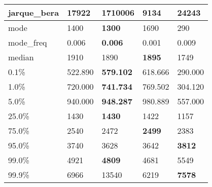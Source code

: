 \begin{table}[H]
\begin{tabular}{|l|m{10em}|m{10em}|m{10em}|m{10em}|}
\hline jarque\_bera & 17922 & \cellcolor[rgb]{0.9, 0.54, 0.52} 1710006 & 9134 & \bfseries 24243 \\
\hline mode & 1400 & \bfseries 1300 & 1690 & \cellcolor[rgb]{0.9, 0.54, 0.52} 290 \\
\hline mode\_freq & 0.006 & \bfseries 0.006 & \cellcolor[rgb]{0.9, 0.54, 0.52} 0.001 & 0.009 \\
\hline median & 1910 & 1890 & \bfseries 1895 & \cellcolor[rgb]{0.9, 0.54, 0.52} 1749 \\
\hline 0.1\% & 522.890 & \bfseries 579.102 & 618.666 & \cellcolor[rgb]{0.9, 0.54, 0.52} 290.000 \\
\hline 1.0\% & 720.000 & \bfseries 741.734 & 769.502 & \cellcolor[rgb]{0.9, 0.54, 0.52} 304.120 \\
\hline 5.0\% & 940.000 & \bfseries 948.287 & 980.889 & \cellcolor[rgb]{0.9, 0.54, 0.52} 557.000 \\
\hline 25.0\% & 1430 & \bfseries 1430 & 1422 & \cellcolor[rgb]{0.9, 0.54, 0.52} 1157 \\
\hline 75.0\% & 2540 & 2472 & \bfseries 2499 & \cellcolor[rgb]{0.9, 0.54, 0.52} 2383 \\
\hline 95.0\% & 3740 & \cellcolor[rgb]{0.9, 0.54, 0.52} 3628 & 3642 & \bfseries 3812 \\
\hline 99.0\% & 4921 & \bfseries 4809 & 4681 & \cellcolor[rgb]{0.9, 0.54, 0.52} 5549 \\
\hline 99.9\% & 6966 & \cellcolor[rgb]{0.9, 0.54, 0.52} 13540 & 6219 & \bfseries 7578 \\
\hline
\end{tabular}
\end{table}
